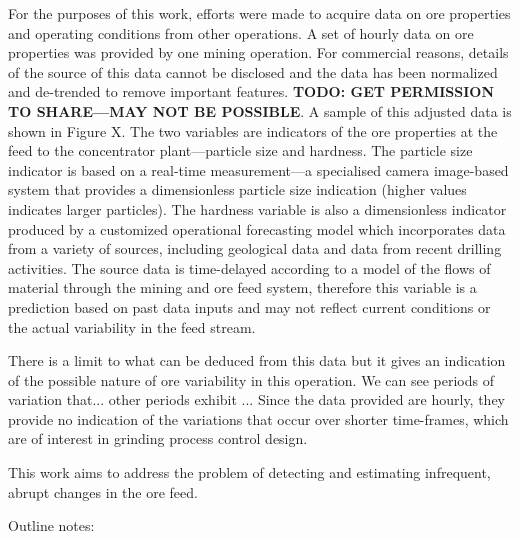 For the purposes of this work, efforts were made to acquire data on ore properties and operating conditions from other operations. A set of hourly data on ore properties was provided by one mining operation. For commercial reasons, details of the source of this data cannot be disclosed and the data has been normalized and de-trended to remove important features. \textbf{TODO: GET PERMISSION TO SHARE—MAY NOT BE POSSIBLE}. A sample of this adjusted data is shown in Figure X. The two variables are indicators of the ore properties at the feed to the concentrator plant---particle size and hardness. The particle size indicator is based on a real-time measurement---a specialised camera image-based system that provides a dimensionless particle size indication (higher values indicates larger particles). The hardness variable is also a dimensionless indicator produced by a customized operational forecasting model which incorporates data from a variety of sources, including geological data and data from recent drilling activities. The source data is time-delayed according to a model of the flows of material through the mining and ore feed system, therefore this variable is a prediction based on past data inputs and may not reflect current conditions or the actual variability in the feed stream.

There is a limit to what can be deduced from this data but it gives an indication of the possible nature of ore variability in this operation. We can see periods of variation that...  other periods exhibit ... Since the data provided are hourly, they provide no indication of the variations that occur over shorter time-frames, which are of interest in grinding process control design.


This work aims to address the problem of detecting and estimating infrequent, abrupt changes in the ore feed.

Outline notes:

